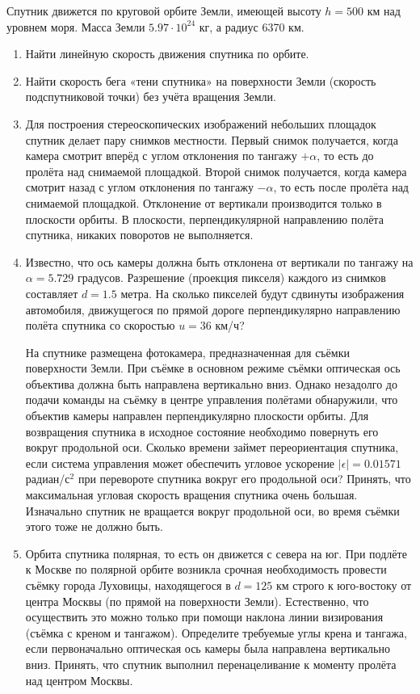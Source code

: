 
Спутник движется по круговой орбите Земли, имеющей высоту $h=500$ км над уровнем моря. Масса Земли $5.97 \cdot 10^{24}$ кг,
а радиус 6370 км.

\begin{enumerate}
    \item Найти линейную скорость движения спутника по орбите.
    \item Найти скорость бега «тени спутника» на поверхности Земли (скорость подспутниковой точки) без учёта 
    вращения Земли.
    \item Для построения стереоскопических изображений небольших площадок спутник делает пару снимков местности. 
    Первый снимок получается, когда камера смотрит вперёд с углом отклонения по тангажу $+\alpha$, то есть до пролёта 
    над снимаемой площадкой. Второй снимок получается, когда камера смотрит назад с углом отклонения по тангажу 
    $-\alpha$, то есть  после пролёта над снимаемой площадкой. Отклонение от вертикали производится только в 
    плоскости орбиты. В плоскости, перпендикулярной направлению полёта спутника, никаких поворотов не выполняется.
    \item Известно, что ось камеры должна быть отклонена от вертикали по тангажу на $\alpha=5.729$ градусов. 
    Разрешение (проекция пикселя) каждого из снимков составляет $d=1.5$ метра. На сколько пикселей будут сдвинуты 
    изображения автомобиля, движущегося по прямой дороге перпендикулярно направлению полёта спутника со скоростью 
    $u=36$ км/ч?

    На спутнике размещена фотокамера, предназначенная для съёмки поверхности Земли. При съёмке в основном режиме 
    съёмки оптическая ось объектива должна быть направлена вертикально вниз. Однако незадолго до подачи команды 
    на съёмку в центре управления полётами обнаружили, что объектив камеры направлен перпендикулярно плоскости 
    орбиты. Для возвращения спутника в исходное состояние необходимо повернуть его вокруг продольной оси. 
    Сколько времени займет переориентация спутника, если система управления может обеспечить угловое ускорение 
    $|\epsilon|=0.01571$ радиан/с$^2$ при перевороте спутника вокруг его продольной оси? Принять, что максимальная 
    угловая скорость вращения спутника очень большая. Изначально спутник не вращается вокруг продольной оси, 
    во время съёмки этого тоже не должно быть.
    \item Орбита спутника полярная, то есть он движется с севера на юг. При подлёте к Москве по полярной 
    орбите возникла срочная необходимость провести съёмку города Луховицы, находящегося в $d=125$ км строго к 
    юго-востоку от центра Москвы (по прямой на поверхности Земли). Естественно, что осуществить это можно только 
    при помощи наклона линии визирования (съёмка с креном и тангажом). Определите требуемые углы крена и тангажа, 
    если первоначально оптическая ось камеры была направлена вертикально вниз. Принять, что спутник выполнил 
    перенацеливание к моменту пролёта над центром Москвы.


\end{enumerate}
